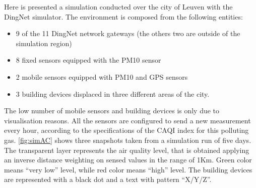 Here is presented a simulation conducted over the city of Leuven with the DingNet simulator. 
The environment is composed from the following entities:
\begin{itemize}
    \item 9 of the 11 DingNet network gateways (the others two are outside of the simulation region)
    \item 8 fixed sensors equipped with the PM10 sensor
    \item 2 mobile sensors equipped with PM10 and GPS sensors
    \item 3 building devices displaced in three different areas of the city.
\end{itemize}
The low number of mobile sensors and building devices is only due to visualisation reasons. 
All the sensors are configured to send a new measurement every hour, according to the specifications of the CAQI index for this polluting gas.
\autoref{fig:simAC} shows three snapshots taken from a simulation run of five days.
The transparent layer represents the air quality level, that is obtained applying an inverse distance weighting on sensed values in the range of 1Km. 
Green color means ``very low'' level, while red color means ``high'' level.
The building devices are represented with a black dot and a text with pattern ``X/Y/Z''.
% 
